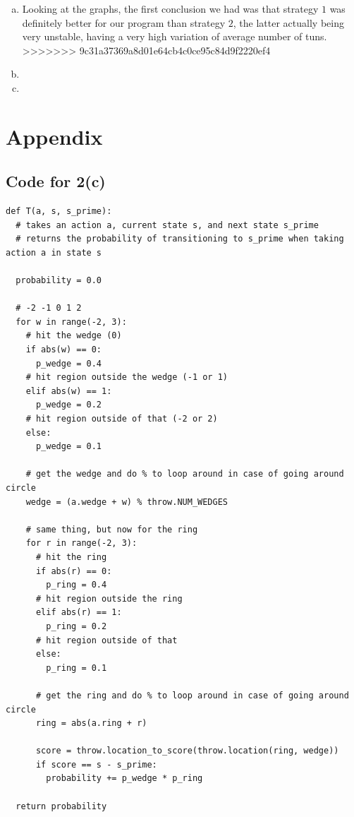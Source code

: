 \documentclass{article}
\begin{document}
\begin{enumerate}
\begin{enumerate}[(a)]
=======
                \item %

                Looking at the graphs, the first conclusion we had was that strategy $1$ was definitely better for our program than strategy $2$, the latter actually being very unstable, having a very high variation of average number of tuns. 
>>>>>>> 9c31a37369a8d01e64cb4c0ce95c84d9f2220ef4
                \item %
                \item %
            \end{enumerate}                
    \end{enumerate}

\newpage
\section*{Appendix}
\subsection*{Code for 2(c)}
\begin{verbatim}
def T(a, s, s_prime):
  # takes an action a, current state s, and next state s_prime
  # returns the probability of transitioning to s_prime when taking action a in state s
  
  probability = 0.0

  # -2 -1 0 1 2
  for w in range(-2, 3):
    # hit the wedge (0)
    if abs(w) == 0:
      p_wedge = 0.4
    # hit region outside the wedge (-1 or 1)
    elif abs(w) == 1:
      p_wedge = 0.2
    # hit region outside of that (-2 or 2)
    else:
      p_wedge = 0.1

    # get the wedge and do % to loop around in case of going around circle
    wedge = (a.wedge + w) % throw.NUM_WEDGES

    # same thing, but now for the ring
    for r in range(-2, 3):
      # hit the ring
      if abs(r) == 0:
        p_ring = 0.4
      # hit region outside the ring
      elif abs(r) == 1:
        p_ring = 0.2
      # hit region outside of that
      else:
        p_ring = 0.1

      # get the ring and do % to loop around in case of going around circle
      ring = abs(a.ring + r)

      score = throw.location_to_score(throw.location(ring, wedge))
      if score == s - s_prime:
        probability += p_wedge * p_ring

  return probability
\end{verbatim}
\end{document}

